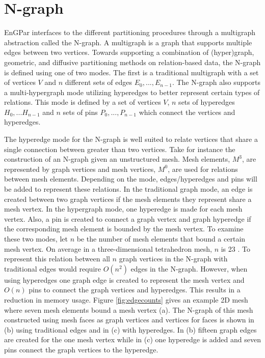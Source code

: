 \section{N-graph}
EnGPar interfaces to the different partitioning procedures through a multigraph
abstraction called the N-graph. A multigraph
\cite{BANGJENSENmultigraph, BOESCHmultigraph} is a graph that supports multiple
edges between two vertices. Towards
supporting a combination of (hyper)graph, geometric, and diffusive partitioning
methods on relation-based data, the N-graph is defined using one of two modes.
The first is a traditional multigraph with a set of vertices $V$ and $n$
different sets of edges $E_0,...,E_{n-1}$. The N-graph also supports a
multi-hypergraph mode utilizing hyperedges to better represent certain types
of relations. This mode is defined by a set of vertices $V$, $n$ sets of
hyperedges $H_0,...H_{n-1}$ and $n$ sets of pins $P_0,...,P_{n-1}$ which
connect the vertices and hyperedges.

The hyperedge mode for the
N-graph is well suited to relate vertices that share a single connection
between greater than two vertices. Take for instance the construction of
an N-graph given an
unstructured mesh. Mesh elements, $M^3$, are represented
by graph vertices and mesh vertices, $M^0$, are used for
relations between mesh elements. Depending on the mode, edges/hyperedges and
pins will be added to represent these relations. In the
traditional graph mode, an edge is created between two
graph vertices if the mesh elements they represent share a mesh
vertex. In the hypergraph mode, one hyperedge is made for
each mesh vertex. Also, a pin is created to connect a
graph vertex and graph hyperedge if the corresponding mesh
element is bounded by the mesh vertex. To examine these two modes, let
$n$ be the number of mesh elements that bound a certain mesh vertex. On average
in a three-dimensional tetrahedron mesh, $n$ is 23 \cite{beall1997general}. To
represent this relation between all $n$ graph vertices in the N-graph with
traditional edges would require $O(n^2)$ edges in the N-graph. However, when
using hyperedges one
graph edge is created to represent the mesh vertex and $O(n)$ pins to connect
the graph vertices and hyperedges. This results in a reduction in memory usage.
Figure \ref{fig:edgecounts} gives an example 2D mesh
where seven mesh elements bound a mesh vertex (a). The
N-graph of this mesh constructed using mesh faces
as graph vertices and vertices for faces is shown in
(b) using traditional edges and in (c) with hyperedges.
In (b) fifteen graph edges are created for the one mesh
vertex while in (c) one hyperedge is added and seven
pins connect the graph vertices to the hyperedge.

